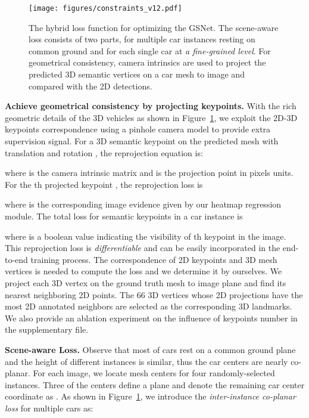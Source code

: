 \documentclass[runningheads]{llncs}
\begin{document}
\begin{figure}[!t]
	\centering
\texttt{[image: figures/constraints\_v12.pdf]}
	\caption{The hybrid loss function for optimizing the GSNet. The scene-aware loss consists of two parts,   for multiple car instances resting on common ground and  for each single car at \textit{a fine-grained level}. For geometrical consistency, camera intrinsics are used to project the predicted 3D semantic vertices on a car mesh to image and compared with the 2D detections.} 
	\label{fig:example3}
\end{figure}

\smallskip\noindent\textbf{Achieve geometrical consistency by projecting keypoints.}
With the rich geometric details of the 3D vehicles as shown in Figure~\ref{fig:example3}, we exploit the 2D-3D keypoints correspondence using a pinhole camera model to provide extra supervision signal. For a 3D semantic keypoint  on the predicted mesh with translation  and rotation , the reprojection equation is:

where  is the camera intrinsic matrix and  is the projection point in pixels units. 
For the th projected keypoint , the reprojection loss is

where  is the corresponding image evidence given by our heatmap regression module.
The total loss  for  semantic keypoints in a car instance is

where  is a boolean value indicating the visibility of th keypoint in the image. This reprojection loss is \textit{differentiable} and can be easily incorporated in the end-to-end training process. The correspondence of 2D keypoints and 3D mesh vertices is needed to compute the loss and we determine it by ourselves. We project each 3D vertex on the ground truth mesh to image plane and find its nearest neighboring 2D points. The 66 3D vertices whose 2D projections have the most 2D annotated neighbors are selected as the corresponding 3D landmarks. We also provide an ablation experiment on the influence of keypoints number in the supplementary file.

\smallskip\noindent\textbf{Scene-aware Loss.}
Observe that most of cars rest on a common ground plane and the height of different instances is similar, thus the car centers are nearly co-planar. For each image, we locate mesh centers for four randomly-selected instances. Three of the centers define a plane  and denote the remaining car center coordinate as . As shown in Figure~\ref{fig:example3}, we introduce the \textit{inter-instance co-planar loss}  for multiple cars  as:
\end{document}

